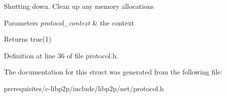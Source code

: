 Shutting down. Clean up any memory allocations 
\begin{DoxyParams}{Parameters}
{\em protocol\+\_\+context} & the context \\
\hline
\end{DoxyParams}
\begin{DoxyReturn}{Returns}
true(1) 
\end{DoxyReturn}


Definition at line 36 of file protocol.\+h.



The documentation for this struct was generated from the following file\+:\begin{DoxyCompactItemize}
\item 
prerequisites/c-\/libp2p/include/libp2p/net/protocol.\+h\end{DoxyCompactItemize}
